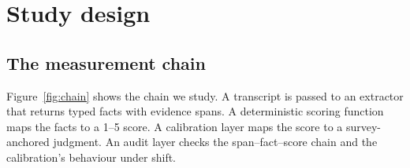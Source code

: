 \documentclass[11pt,a4paper]{article}
\begin{document}
\section{Study design}
\label{sec:design}

\subsection{The measurement chain}

Figure~\ref{fig:chain} shows the chain we study. A transcript is passed to an extractor that
returns typed facts with evidence spans. A deterministic scoring function maps the facts to a
1--5 score. A calibration layer maps the score to a survey-anchored judgment. An audit layer
checks the span--fact--score chain and the calibration's behaviour under shift.
\end{document}
